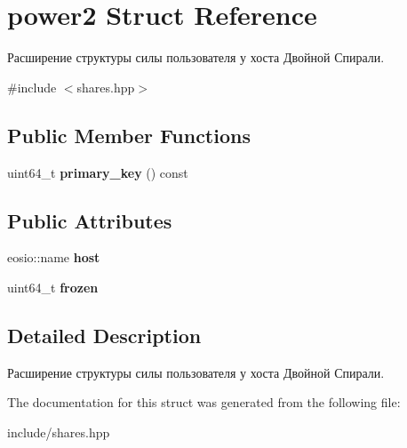 \hypertarget{structpower2}{}\section{power2 Struct Reference}
\label{structpower2}


Расширение структуры силы пользователя у хоста Двойной Спирали.  




{\ttfamily \#include $<$shares.\+hpp$>$}

\subsection*{Public Member Functions}
\begin{DoxyCompactItemize}
\item 
\mbox{\label{structpower2_a19e385a354dbb08dff7385cc4a2da457}} 
uint64\+\_\+t {\bfseries primary\+\_\+key} () const
\end{DoxyCompactItemize}
\subsection*{Public Attributes}
\begin{DoxyCompactItemize}
\item 
\mbox{\label{structpower2_ab2ac79460fae527f88c8a70a24cf23e9}} 
eosio\+::name {\bfseries host}
\item 
\mbox{\label{structpower2_a1f6545b2cf1eeac414b618c48cad89cb}} 
uint64\+\_\+t {\bfseries frozen}
\end{DoxyCompactItemize}


\subsection{Detailed Description}
Расширение структуры силы пользователя у хоста Двойной Спирали. 

The documentation for this struct was generated from the following file\+:\begin{DoxyCompactItemize}
\item 
include/shares.\+hpp\end{DoxyCompactItemize}
